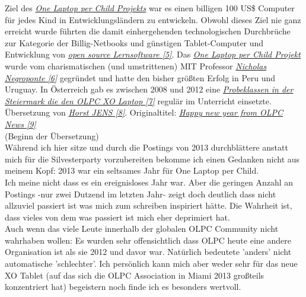 Ziel des \href{http://one.laptop.org/}{\textit{One Laptop per Child Projekts}} war es einen billigen 100 US\$ Computer für jedes Kind in Entwicklungsländern zu entwickeln. Obwohl dieses Ziel nie ganz erreicht wurde führten die damit einhergehenden technologischen Durchbrüche zur Kategorie der Billig-Netbooks und günstigen Tablet-Computer und Entwicklung von \href{https://en.wikipedia.org/wiki/Sugar_(desktop_environment)}{\textit{open source Lernsoftware [5]}}. Das \href{http://one.laptop.org/}{\textit{One Laptop per Child Projekt}} wurde vom charismatischen (und umstrittenen) MIT Professor \href{https://de.wikipedia.org/wiki/Nicholas_Negroponte}{\textit{Nicholas Negroponte [6]}} gegründet und hatte den bisher größten Erfolg in Peru und Uruguay. In Österreich gab es zwischen 2008 und 2012 eine \href{http://www.fuzo-archiv.at/artikel/1503081v2}{\textit{Probeklassen in der Steiermark die den OLPC XO Laptop [7]}} regulär im Unterricht einsetzte. \\

Übersetzung von \href{http://spielend-programmieren.at}{\textit{Horst JENS [8]}}. Originaltitel: \href{http://www.olpcnews.com/commentary/olpc_news/happy_new_year_from_olpc_news.html}{\textit{Happy new year from OLPC News [9]}} \\

(Beginn der Übersetzung) \\

Während ich hier sitze und durch die Postings von 2013 durchblättere anstatt mich für die Silvesterparty vorzubereiten bekomme ich einen Gedanken nicht aus meinem Kopf: 2013 war ein seltsames Jahr für One Laptop per Child. \\

Ich meine nicht dass es ein ereignisloses Jahr war. Aber die geringen Anzahl an Postings -nur zwei Dutzend im letzten Jahr- zeigt doch deutlich dass nicht allzuviel passiert ist was mich zum schreiben inspiriert hätte. Die Wahrheit ist, dass vieles von dem was passiert ist mich eher deprimiert hat. \\

Auch wenn das viele Leute innerhalb der globalen OLPC Community nicht wahrhaben wollen: Es wurden sehr offensichtlich dass OLPC heute eine andere Organisation ist als sie 2012 und davor war. Natürlich bedeutete 'anders' nicht automatische 'schlechter'. Ich persönlich kann mich aber weder sehr für das neue XO Tablet (auf das sich die OLPC Association in Miami 2013 großteils konzentriert hat) begeistern noch finde ich es besonders wertvoll. \\

